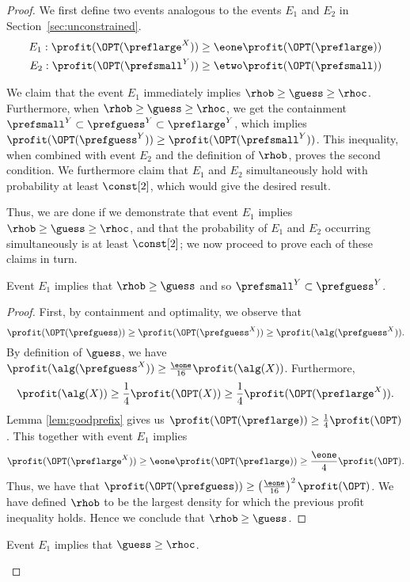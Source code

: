 \begin{proof}
We first define two events analogous to the events $E_1$ and $E_2$ in
Section~\ref{sec:unconstrained}.
\begin{align*}
E_1: \profit(\OPT(\preflarge^X)) & \geq \eone
\profit(\OPT(\preflarge)) \\ E_2: \profit(\OPT(\prefsmall^Y)) & \geq
\etwo \profit(\OPT(\prefsmall))
\end{align*}

We claim that the event $E_1$ immediately implies
$\rhob\ge\guess\ge\rhoc$. Furthermore, when $\rhob\ge\guess\ge\rhoc$,
we get the containment
$\prefsmall^Y \subset \prefguess^Y \subset \preflarge^Y$, which
implies
$\profit(\OPT(\prefguess^Y)) \geq \profit(\OPT(\prefsmall^Y))$. This
inequality, when combined with event $E_2$ and the definition of
$\rhob$, proves the second condition. We furthermore claim that $E_1$
and $E_2$ simultaneously hold with probability at least $\const[2]$,
which would give the desired result.

Thus, we are done if we demonstrate that event $E_1$ implies
$\rhob\ge\guess\ge\rhoc$, and that the probability of $E_1$ and $E_2$
occurring simultaneously is at least $\const[2]$; we now proceed to prove each of
these claims in turn.






\begin{claim}
\label{lem:upperbound_guess}
  Event $E_1$ implies that $\rhob \geq \guess$ and so $\prefsmall^Y
  \subset \prefguess^Y$.
\end{claim}

\begin{proof}
  First, by containment and optimality, we observe that
  \[\profit(\OPT(\prefguess))
  \geq \profit(\OPT(\prefguess^X)) \geq \profit(\alg(\prefguess^X)).\] 
  By definition of $\guess$, we have $\profit(\alg(\prefguess^X)) \geq
  \frac{\eone}{16}\profit(\alg(X))$. Furthermore, \[\profit(\alg(X))
  \geq \frac{1}{4}\profit(\OPT(X)) \geq
  \frac{1}{4}\profit(\OPT(\preflarge^X)). \]
  Lemma \ref{lem:goodprefix} gives us $\profit(\OPT(\preflarge)) \geq
  \frac{1}{4}\profit(\OPT)$. This together with event $E_1$ implies
  \[\profit(\OPT(\preflarge^X)) 
  \geq \eone \profit(\OPT(\preflarge)) \geq \frac{\eone}{4}
  \profit(\OPT).\]
  Thus, we have that $\profit(\OPT(\prefguess)) \geq
  \left(\frac{\eone}{16}\right)^2 \profit(\OPT)$.  We have defined
  $\rhob$ to be the largest density for which the previous profit
  inequality holds. Hence we conclude that $\rhob \geq \guess$.
\end{proof}
\begin{claim}
\label{lem:lowerbound_guess}
  Event $E_1$ implies that $\guess \geq \rhoc$.
\end{claim}


\end{proof}
